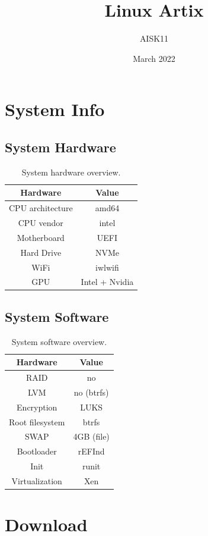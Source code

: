 \documentclass[10pt, a4paper, onecolumn, oneside, titlepage, openany]{book}
\title{\textbf{Linux Artix}}
\author{AISK11}
\date{March 2022}
\begin{document}
\maketitle
\tableofcontents


\chapter{System Info}
\section{System Hardware}
\begin{table}[h!]
\centering
\begin{tabular}{|c|c|}
    \hline
    \textbf{Hardware} & \textbf{Value} \\
    \hline
    CPU architecture & amd64\\
    CPU vendor & intel\\
    Motherboard & UEFI\\
    Hard Drive & NVMe\\
    WiFi & iwlwifi\\
    GPU & Intel + Nvidia\\
    \hline
\end{tabular}
\caption{System hardware overview.}
\label{table:1}
\end{table}

\section{System Software}
\begin{table}[h!]
\centering
\begin{tabular}{|c|c|}
    \hline
    \textbf{Hardware} & \textbf{Value} \\
    \hline
    RAID & no\\
    LVM & no (btrfs)\\
    Encryption & LUKS\\
    Root filesystem & btrfs\\
    SWAP & 4GB (file)\\
    Bootloader & rEFInd\\
    Init & runit\\
    Virtualization & Xen\\
    \hline
\end{tabular}
\caption{System software overview.}
\label{table:2}
\end{table}


\chapter{Download}
\end{document}

